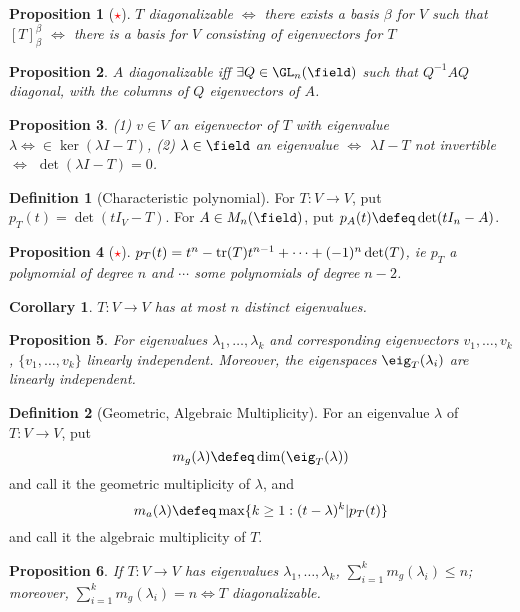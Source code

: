 \documentclass[12pt, oneside]{article}
\theoremstyle{definition}
\newtheorem{defn}{Definition}
\theoremstyle{plain}
\newtheorem{cor}{Corollary}
\newtheorem{prop}{Proposition}
\theoremstyle{remark}
\begin{document}
\begin{prop}[\textcolor{red}{$\star$}]
  $T$ diagonalizable $\iff$ there exists a basis $\beta$ for $V$ such that $[T]_\beta^\beta$ $\iff$ there is a basis for $V$ consisting of eigenvectors for $T$
\end{prop}

\begin{prop}
  $A$ diagonalizable iff $\exists Q \in \GL_n(\field)$ such that $Q^{-1}A Q$ diagonal, with the columns of $Q$ eigenvectors  of $A$.
\end{prop}

\begin{prop}
  (1) $v \in V$ an eigenvector of $T$ with eigenvalue $\lambda \iff \in \ker(\lambda I - T)$, (2) $\lambda \in \field$ an eigenvalue $\iff$ $\lambda I - T$ not invertible $\iff$ $\det(\lambda I - T) = 0$.
\end{prop}

\begin{defn}[Characteristic polynomial]
  For $T : V \to V$, put $p_T(t) = \det(tI_V - T)$. For $A \in M_n(\field)$, put $p_A(t) \defeq \det(tI_n - A)$.
\end{defn}

\begin{prop}[\textcolor{red}{$\star$}]
  $p_T(t) = t^n - \tr(T)t^{n-1} + \cdots + (-1)^n \det(T)$, ie $p_T$ a polynomial of degree $n$ and $\cdots$ some polynomials of degree $n-2$.
\end{prop}

\begin{cor}
  $T : V \to V$ has at most $n$ distinct eigenvalues.
\end{cor}

\begin{prop}
  For eigenvalues $\lambda_1, \dots, \lambda_k$ and corresponding eigenvectors $v_1, \dots, v_k$, $\{v_1, \dots, v_k\}$ linearly independent. Moreover, the eigenspaces $\eig_T(\lambda_i)$ are linearly independent.
\end{prop}

\begin{defn}[Geometric, Algebraic Multiplicity]
  For an eigenvalue $\lambda$ of $T : V \to V$, put \[
  m_g(\lambda) \defeq \dim(\eig_T(\lambda)) 
  \]
  and call it the geometric multiplicity of $\lambda$, and \[
  m_a(\lambda) \defeq \max \{k \geq 1 : (t - \lambda)^k \vert p_T(t)\}
  \]
  and call it the algebraic multiplicity of $T$.
\end{defn}

\begin{prop}
  If $T : V \to V$ has eigenvalues $\lambda_1, \dots, \lambda_k$, $\sum_{i=1}^k m_g(\lambda_i) \leq n$; moreover, $\sum_{i=1}^k m_g(\lambda_i) = n \iff T$ diagonalizable.
\end{prop}
\end{document}
